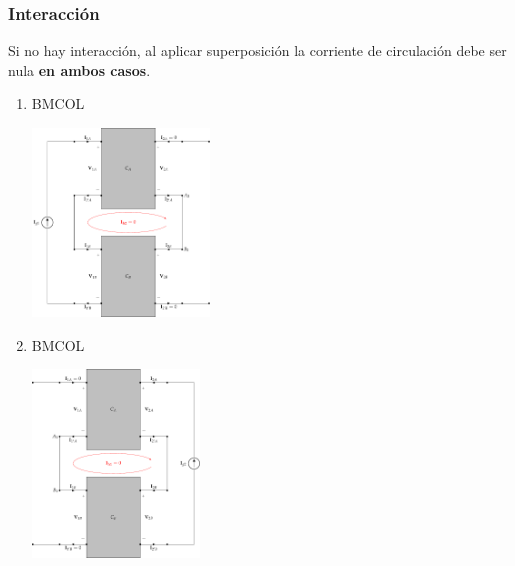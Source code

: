 \subsubsection{Interacción}
\label{sec:org45b1cf7}
Si no hay interacción, al aplicar superposición la corriente de circulación debe ser nula \textbf{en ambos casos}.
\begin{enumerate}
\item \hfill{}\textsc{BMCOL}
\label{sec:org7b3b505}

\includegraphics[height=5cm]{../figs/serie-serie-superposicion-entrada.pdf}

\item \hfill{}\textsc{BMCOL}
\label{sec:orgfc7026f}

\includegraphics[height=5cm]{../figs/serie-serie-superposicion-salida.pdf}

\end{enumerate}

